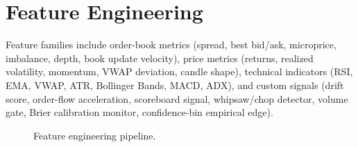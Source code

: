 \section{Feature Engineering}
\label{sec:features}

Feature families include order-book metrics (spread, best bid/ask, microprice,
imbalance, depth, book update velocity), price metrics (returns, realized
volatility, momentum, VWAP deviation, candle shape), technical indicators (RSI,
EMA, VWAP, ATR, Bollinger Bands, MACD, ADX), and custom signals (drift score,
order-flow acceleration, scoreboard signal, whipsaw/chop detector, volume gate,
Brier calibration monitor, confidence-bin empirical edge).

\begin{figure}[t]
  \centering
  \caption{Feature engineering pipeline.}
  \label{fig:features}
\end{figure}